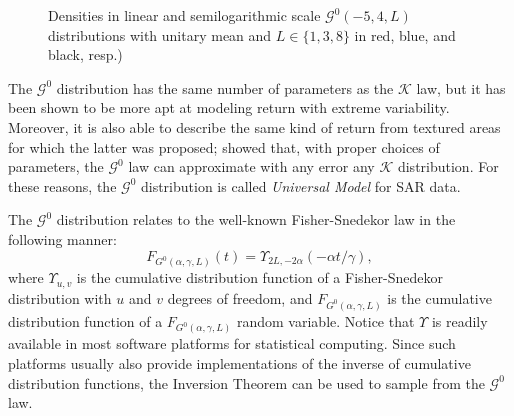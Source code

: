 \documentclass{beamer}
\begin{document}
\begin{frame}[allowframebreaks]
\begin{figure}[hbt]
\centering
{}
\caption[Densities in linear and semilogarithmic scale $\mathcal G^0(-5,4,L)$ distributions with unitary mean and $L\in\{1,3,8\}$]{Densities in linear and semilogarithmic scale $\mathcal G^0(-5,4,L)$ distributions with unitary mean and $L\in\{1,3,8\}$ in red, blue, and black, resp.)}\label{Fig:GI0DistributionLooks}
\end{figure}

The $\mathcal{G}^0$ distribution has the same number of parameters as the $\mathcal{K}$ law, but it has been shown to be more apt at modeling return with extreme variability.
Moreover, it is also able to describe the same kind of return from textured areas for which the latter was proposed; \citet{MejailJacoboFreryBustos:IJRS} showed that, with proper choices of parameters, the $\mathcal G^0$ law can approximate with any error any $\mathcal K$ distribution.
For these reasons, the $\mathcal G^0$ distribution is called \textit{Universal Model} for SAR data.

The $\mathcal G^0$ distribution relates to the well-known Fisher-Snedekor law in the following manner:
\begin{equation}
F_{G^0(\alpha,\gamma,L)}(t) = \Upsilon_{2L,- 2\alpha}(- \alpha t/\gamma),
\end{equation}
where $\Upsilon_{u,v}$ is the cumulative distribution function of a Fisher-Snedekor distribution with $u$ and $v$ degrees of freedom, and $F_{G^0(\alpha,\gamma,L)}$ is the cumulative distribution function of a $F_{G^0(\alpha,\gamma,L)}$ random variable.
Notice that $\Upsilon$ is readily available in most software platforms for statistical computing.
Since such platforms usually also provide implementations of the inverse of cumulative distribution functions, the Inversion Theorem can be used to sample from the $\mathcal G^0$ law.


\end{frame}
\end{document}
